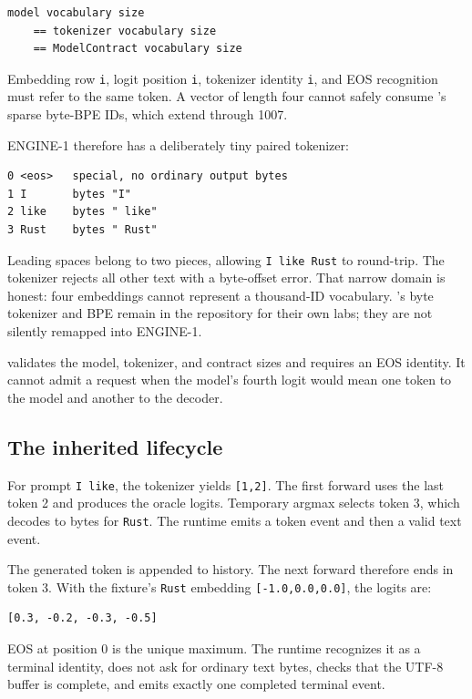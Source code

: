 \begin{verbatim}
model vocabulary size
    == tokenizer vocabulary size
    == ModelContract vocabulary size
\end{verbatim}

Embedding row \texttt{i}, logit position \texttt{i}, tokenizer identity
\texttt{i}, and EOS recognition must refer to the same token. A vector
of length four cannot safely consume 's sparse byte-BPE IDs,
which extend through 1007.

ENGINE-1 therefore has a deliberately tiny paired tokenizer:

\begin{verbatim}
0 <eos>   special, no ordinary output bytes
1 I       bytes "I"
2 like    bytes " like"
3 Rust    bytes " Rust"
\end{verbatim}

Leading spaces belong to two pieces, allowing \texttt{I\ like\ Rust} to
round-trip. The tokenizer rejects all other text with a byte-offset
error. That narrow domain is honest: four embeddings cannot represent a
thousand-ID vocabulary. 's byte tokenizer and BPE remain in the
repository for their own labs; they are not silently remapped into
ENGINE-1.

\texttt{} validates the model, tokenizer,
and contract sizes and requires an EOS identity. It cannot admit a
request when the model's fourth logit would mean one token to the model
and another to the decoder.

\subsection{The inherited lifecycle}\label{the-inherited-lifecycle}

For prompt \texttt{I\ like}, the tokenizer yields \texttt{{[}1,2{]}}.
The first forward uses the last token 2 and produces the oracle logits.
Temporary argmax selects token 3, which decodes to bytes for
\texttt{Rust}. The runtime emits a token event and then a valid text
event.

The generated token is appended to history. The next forward therefore
ends in token 3. With the fixture's \texttt{Rust} embedding
\texttt{{[}-1.0,0.0,0.0{]}}, the logits are:

\begin{verbatim}
[0.3, -0.2, -0.3, -0.5]
\end{verbatim}

EOS at position 0 is the unique maximum. The runtime recognizes it as a
terminal identity, does not ask for ordinary text bytes, checks that the
UTF-8 buffer is complete, and emits exactly one completed terminal
event.

